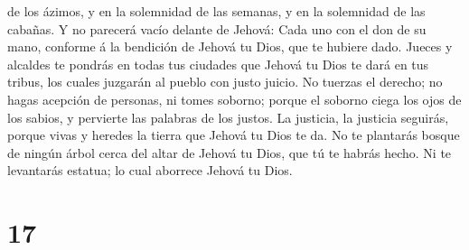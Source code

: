 de los ázimos, y en la solemnidad de las semanas, y en la solemnidad de
las cabañas. Y no parecerá vacío delante de Jehová:  Cada
uno con el don de su mano, conforme á la bendición de Jehová tu Dios,
que te hubiere dado.  Jueces y alcaldes te pondrás en todas
tus ciudades que Jehová tu Dios te dará en tus tribus, los cuales
juzgarán al pueblo con justo juicio.  No tuerzas el
derecho; no hagas acepción de personas, ni tomes soborno; porque el
soborno ciega los ojos de los sabios, y pervierte las palabras de los
justos.  La justicia, la justicia seguirás, porque vivas y
heredes la tierra que Jehová tu Dios te da.  No te
plantarás bosque de ningún árbol cerca del altar de Jehová tu Dios, que
tú te habrás hecho.  Ni te levantarás estatua; lo cual
aborrece Jehová tu Dios.

\hypertarget{section-16}{%
\section{17}\label{section-16}}

